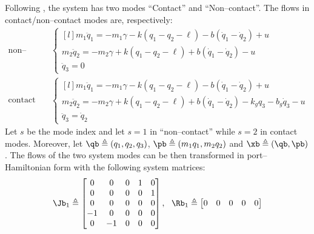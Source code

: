 \begin{exmp}
    Following \citep{Ishikawa2003}, the system has two modes ``Contact'' and ``Non--contact''. The flows in contact/non--contact modes are, respectively:
    \begin{align}
        \text{non--contact}\quad
        &\left\{
            \begin{matrix*}[l]
            m_1\ddot{q}_1 = -m_1\gamma -k\left(q_1-q_2-\ell\right) -b\left(\dot{q}_1-\dot{q}_2\right) + u\\
            m_2\ddot{q}_2 = -m_2\gamma +k\left(q_1-q_2-\ell\right) +b\left(\dot{q}_1-\dot{q}_2\right) - u\\
            \ddot{q}_3 = 0
            \end{matrix*}
        \right.\\
        \text{contact}\quad
        &\left\{
            \begin{matrix*}[l]
            m_1\ddot{q}_1 = -m_1\gamma -k\left(q_1-q_2-\ell\right) -b\left(\dot{q}_1-\dot{q}_2\right) + u\\
            m_2\ddot{q}_2 = -m_2\gamma +k\left(q_1-q_2-\ell\right) +b\left(\dot{q}_1-\dot{q}_2\right) - k_gq_3-b_g\dot{q}_3 - u\\
            \ddot{q}_3 = \dot{q}_2
            \end{matrix*}
        \right.
    \end{align}
    Let $s$ be the mode index and let $s=1$ in ``non--contact'' while $s=2$ in contact modes. Moreover, let $\qb \triangleq (q_1,q_2,q_3)$, $\pb\triangleq (m_1q_1,m_2q_2)$ and $\xb\triangleq(\qb,\pb)$. The flows of the two system modes can be then transformed in port--Hamiltonian form with the following system matrices:
    \begin{equation}
        \Jb_1\triangleq
        \begin{bmatrix}
            0&0&0&1&0\\
            0&0&0&0&1\\
            0&0&0&0&0\\
            -1&0&0&0&0\\
            0&-1&0&0&0\\
        \end{bmatrix},~~
        \Rb_1\triangleq
        \begin{bmatrix}
            0&0&0&0&0\\

\end{bmatrix}
\end{equation}
\end{exmp}
